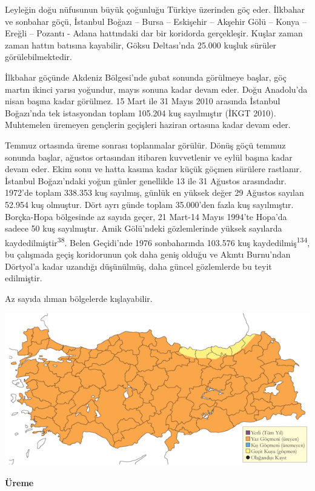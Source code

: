 \documentclass[
  letterpaper,
  DIV=11,
  numbers=noendperiod]{scrreprt}
\begin{document}
Leyleğin doğu nüfusunun büyük çoğunluğu Türkiye üzerinden göç eder.
İlkbahar ve sonbahar göçü, İstanbul Boğazı -- Bursa -- Eskişehir --
Akşehir Gölü -- Konya -- Ereğli -- Pozantı - Adana hattındaki dar bir
koridorda gerçekleşir. Kuşlar zaman zaman hattın batısına kayabilir,
Göksu Deltası'nda 25.000 kuşluk sürüler görülebilmektedir.

İlkbahar göçünde Akdeniz Bölgesi'nde şubat sonunda görülmeye başlar, göç
martın ikinci yarısı yoğundur, mayıs sonuna kadar devam eder. Doğu
Anadolu'da nisan başına kadar görülmez. 15 Mart ile 31 Mayıs 2010
arasında İstanbul Boğazı'nda tek istasyondan toplam 105.204 kuş
sayılmıştır (İKGT 2010). Muhtemelen üremeyen gençlerin geçişleri haziran
ortasına kadar devam eder.

Temmuz ortasında üreme sonrası toplanmalar görülür. Dönüş göçü temmuz
sonunda başlar, ağustos ortasından itibaren kuvvetlenir ve eylül başına
kadar devam eder. Ekim sonu ve hatta kasıma kadar küçük göçmen sürülere
rastlanır. İstanbul Boğazı'ndaki yoğun günler genellikle 13 ile 31
Ağustos arasındadır. 1972'de toplam 338.353 kuş sayılmış, günlük en
yüksek değer 29 Ağustos sayılan 52.954 kuş olmuştur. Dört ayrı günde
toplam 35.000'den fazla kuş sayılmıştır. Borçka-Hopa bölgesinde az
sayıda geçer, 21 Mart-14 Mayıs 1994'te Hopa'da sadece 50 kuş
sayılmıştır. Amik Gölü'ndeki gözlemlerinde yüksek sayılarda
kaydedilmiştir\textsuperscript{38}. Belen Geçidi'nde 1976 sonbaharında
103.576 kuş kaydedilmiş\textsuperscript{134}, bu çalışmada geçiş
koridorunun çok daha geniş olduğu ve Akıntı Burnu'ndan Dörtyol'a kadar
uzandığı düşünülmüş, daha güncel gözlemlerde bu teyit edilmiştir.

Az sayıda ılıman bölgelerde kışlayabilir.

\includegraphics{images/harita_Page_060.png}

\textbf{Üreme}
\end{document}
